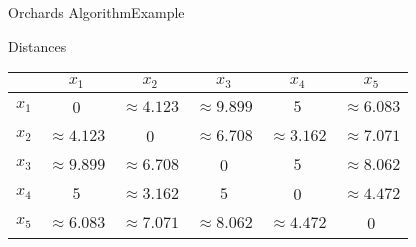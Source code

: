 \documentclass[handout]{beamer}
\begin{document}
\begin{frame}{Orchards Algorithm}{Example}
  \begin{block}{Distances}
  \begin{center}
    \begin{tabular}{r|ccccc}
      & $x_1$ & $x_2$ & $x_3$ & $x_4$ & $x_5$\\
      \hline
      $x_1$ & 0 & $\approx 4.123$ & $\approx 9.899$ & $5$ & $\approx 6.083$\\
      $x_2$ & $\approx 4.123$ & 0 & $\approx 6.708$ & $\approx 3.162$ & $\approx 7.071$\\
      $x_3$ & $\approx 9.899$ & $\approx 6.708$ & 0 & $5$ & $\approx 8.062$\\
      $x_4$ & $5$ & $\approx 3.162$ & $5$ & 0 & $\approx 4.472$\\
      $x_5$ & $\approx 6.083$ & $\approx 7.071$ & $\approx 8.062$ & $\approx 4.472$ & 0\\
    \end{tabular}
  \end{center}
  \end{block}
\end{frame}
\end{document}
